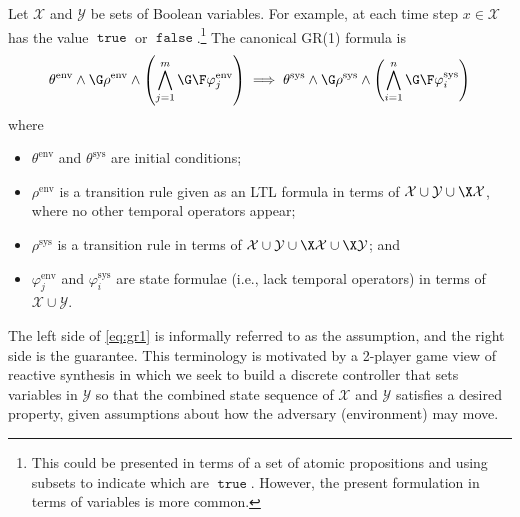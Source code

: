 \documentclass{amsart}
\DeclareMathOperator{\true}{\mathtt{true}}
\DeclareMathOperator{\false}{\mathtt{false}}
\theoremstyle{plain}
\theoremstyle{definition}
\theoremstyle{definition}
\begin{document}
Let $\mathcal{X}$ and $\mathcal{Y}$ be sets of Boolean variables.  For example,
at each time step $x\in\mathcal{X}$ has the value $\true$ or
$\false$.\footnote{This could be presented in terms of a set of atomic
  propositions and using subsets to indicate which are $\true$.  However, the
  present formulation in terms of variables is more common.}  The canonical
GR(1) formula is
\begin{equation}\label{eq:gr1}
  \theta^{\mathrm{env}} \wedge \G \rho^{\mathrm{env}} \wedge \left( \bigwedge_{j=1}^{m} \G\F \varphi^{\mathrm{env}}_{j} \right) \implies \theta^{\mathrm{sys}} \wedge \G \rho^{\mathrm{sys}} \wedge \left( \bigwedge_{i=1}^{n} \G\F \varphi^{\mathrm{sys}}_{i} \right)
\end{equation}
where
\begin{itemize}
\item $\theta^{\mathrm{env}}$ and $\theta^{\mathrm{sys}}$ are initial conditions;
\item $\rho^{\mathrm{env}}$ is a transition rule given as an LTL formula in terms of $\mathcal{X}\cup\mathcal{Y}\cup\X\mathcal{X}$, where no other temporal operators appear;
\item $\rho^{\mathrm{sys}}$ is a transition rule in terms of $\mathcal{X}\cup\mathcal{Y}\cup\X\mathcal{X}\cup\X\mathcal{Y}$; and
\item $\varphi^{\mathrm{env}}_{j}$ and $\varphi^{\mathrm{sys}}_{i}$ are state formulae (i.e., lack temporal operators) in terms of $\mathcal{X}\cup\mathcal{Y}$.
\end{itemize}
The left side of \eqref{eq:gr1} is informally referred to as the assumption, and
the right side is the guarantee.  This terminology is motivated by a 2-player
game view of reactive synthesis in which we seek to build a discrete controller
that sets variables in $\mathcal{Y}$ so that the combined state sequence of
$\mathcal{X}$ and $\mathcal{Y}$ satisfies a desired property, given assumptions
about how the adversary (environment) may move.



\end{document}

